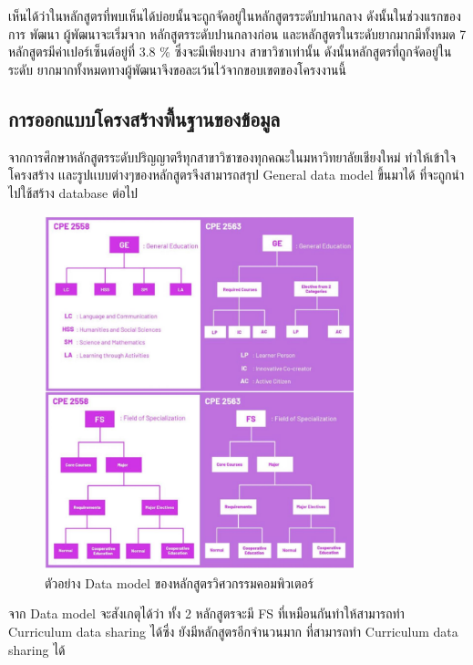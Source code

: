 เห็นได้ว่าในหลักสูตรที่พบเห็นได้บ่อยนั้นจะถูกจัดอยู่ในหลักสูตรระดับปานกลาง ดังนั้นในช่วงแรกของการ พัฒนา ผู้พัฒนาจะเริ่มจาก
หลักสูตรระดับปานกลางก่อน และหลักสูตรในระดับยากมากมีทั้งหมด 7 หลักสูตรมีค่าเปอร์เซ็นต์อยู่ที่ 3.8 \% ซึ่งจะมีเพียงบาง
สาขาวิชาเท่านั้น ดังนั้นหลักสูตรที่ถูกจัดอยู่ในระดับ ยากมากทั้งหมดทางผู้พัฒนาจึงขอละเว้นไว้จากขอบเขตของโครงงานนี้


\subsection{การออกแบบโครงสร้างพื้นฐานของข้อมูล}

จากการศึกษาหลักสูตรระดับปริญญาตรีทุกสาขาวิชาของทุกคณะในมหาวิทยาลัยเชียงใหม่ ทําให้เข้าใจโครงสร้าง
เเละรูปเเบบต่างๆของหลักสูตรจึงสามารถสรุป General data model ขึ้นมาได้ ที่จะถูกนําไปใช้สร้าง database ต่อไป

\begin{figure}[H]
  \begin{center}
    \includegraphics[width=0.8\textwidth]{dModel.png}
    \caption{ตัวอย่าง Data model ของหลักสูตรวิศวกรรมคอมพิวเตอร์}
    \label{fig:dModel}
  \end{center}
\end{figure}

จาก Data model จะสังเกตุได้ว่า ทั้ง 2 หลักสูตรจะมี FS ที่เหมือนกันทำให้สามารถทำ Curriculum data sharing ได้ซึ่ง
ยังมีหลักสูตรอีกจำนวนมาก ที่สามารถทำ Curriculum data sharing ได้


